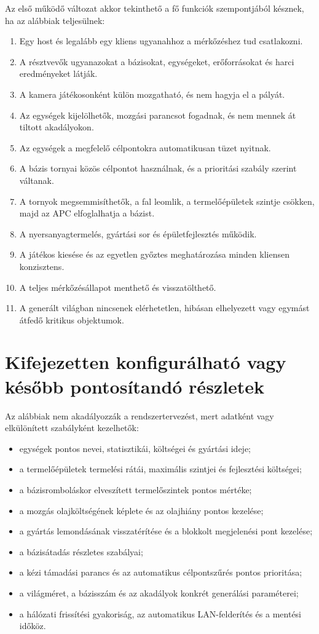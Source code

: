 \documentclass[12pt,a4paper]{article}
\begin{document}
Az első működő változat akkor tekinthető a fő funkciók szempontjából késznek, ha az alábbiak teljesülnek:

\begin{enumerate}
  \item Egy host és legalább egy kliens ugyanahhoz a mérkőzéshez tud csatlakozni.
  \item A résztvevők ugyanazokat a bázisokat, egységeket, erőforrásokat és harci eredményeket látják.
  \item A kamera játékosonként külön mozgatható, és nem hagyja el a pályát.
  \item Az egységek kijelölhetők, mozgási parancsot fogadnak, és nem mennek át tiltott akadályokon.
  \item Az egységek a megfelelő célpontokra automatikusan tüzet nyitnak.
  \item A bázis tornyai közös célpontot használnak, és a prioritási szabály szerint váltanak.
  \item A tornyok megsemmisíthetők, a fal leomlik, a termelőépületek szintje csökken, majd az APC elfoglalhatja a bázist.
  \item A nyersanyagtermelés, gyártási sor és épületfejlesztés működik.
  \item A játékos kiesése és az egyetlen győztes meghatározása minden kliensen konzisztens.
  \item A teljes mérkőzésállapot menthető és visszatölthető.
  \item A generált világban nincsenek elérhetetlen, hibásan elhelyezett vagy egymást átfedő kritikus objektumok.
\end{enumerate}

\section{Kifejezetten konfigurálható vagy később pontosítandó részletek}

Az alábbiak nem akadályozzák a rendszertervezést, mert adatként vagy elkülönített szabályként kezelhetők:

\begin{itemize}
  \item egységek pontos nevei, statisztikái, költségei és gyártási ideje;
  \item a termelőépületek termelési rátái, maximális szintjei és fejlesztési költségei;
  \item a bázisromboláskor elveszített termelőszintek pontos mértéke;
  \item a mozgás olajköltségének képlete és az olajhiány pontos kezelése;
  \item a gyártás lemondásának visszatérítése és a blokkolt megjelenési pont kezelése;
  \item a bázisátadás részletes szabályai;
  \item a kézi támadási parancs és az automatikus célpontszűrés pontos prioritása;
  \item a világméret, a bázisszám és az akadályok konkrét generálási paraméterei;
  \item a hálózati frissítési gyakoriság, az automatikus LAN-felderítés és a mentési időköz.
\end{itemize}
\end{document}
